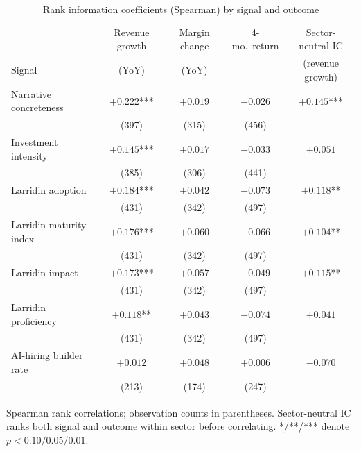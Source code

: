 \documentclass[11pt]{article}
\begin{document}
\begin{table}[H]
\centering
\begin{threeparttable}
\caption{Rank information coefficients (Spearman) by signal and outcome}
\label{tab:ic}
\small
\begin{tabular}{lcccc}
\toprule
 & Revenue growth & Margin change & 4-mo.\ return & Sector-neutral IC\\
Signal & (YoY) & (YoY) & & (revenue growth)\\
\midrule
Narrative concreteness & $+0.222$*** & $+0.019$ & $-0.026$ & $+0.145$***\\
 & (397) & (315) & (456) & \\
Investment intensity & $+0.145$*** & $+0.017$ & $-0.033$ & $+0.051$\\
 & (385) & (306) & (441) & \\
Larridin adoption & $+0.184$*** & $+0.042$ & $-0.073$ & $+0.118$**\\
 & (431) & (342) & (497) & \\
Larridin maturity index & $+0.176$*** & $+0.060$ & $-0.066$ & $+0.104$**\\
 & (431) & (342) & (497) & \\
Larridin impact & $+0.173$*** & $+0.057$ & $-0.049$ & $+0.115$**\\
 & (431) & (342) & (497) & \\
Larridin proficiency & $+0.118$** & $+0.043$ & $-0.074$ & $+0.041$\\
 & (431) & (342) & (497) & \\
AI-hiring builder rate & $+0.012$ & $+0.048$ & $+0.006$ & $-0.070$\\
 & (213) & (174) & (247) & \\
\bottomrule
\end{tabular}
\begin{tablenotes}\footnotesize
\item Spearman rank correlations; observation counts in parentheses.
Sector-neutral IC ranks both signal and outcome within sector before
correlating. */**/*** denote $p<0.10/0.05/0.01$.
\end{tablenotes}
\end{threeparttable}
\end{table}
\end{document}
